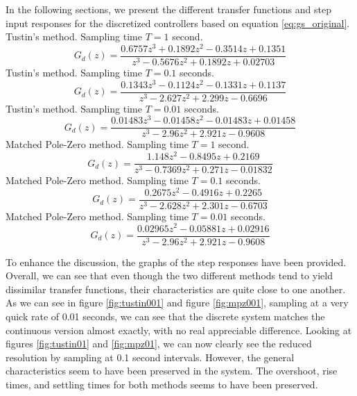 \documentclass[a4paper, 12pt]{article}
\begin{document}
In the following sections, we present the different transfer functions and step
input responses for the discretized controllers based on equation \eqref{eq:gs_original}.\\

\noindent Tustin's method. Sampling time $T = 1$ second.
\begin{equation}
  G_d(z) = \frac{0.6757 z^3 + 0.1892 z^2 - 0.3514 z + 0.1351}{z^3 - 0.5676 z^2 + 0.1892 z + 0.02703}
  \label{eq:tustin_1}
\end{equation}
\noindent Tustin's method. Sampling time $T = 0.1$ seconds.
\begin{equation}
  G_d(z) = \frac{0.1343 z^3 - 0.1124 z^2 - 0.1331 z + 0.1137}{z^3 - 2.627 z^2 + 2.299 z - 0.6696}
  \label{eq:tustin_01}
\end{equation}
\noindent Tustin's method. Sampling time $T = 0.01$ seconds.
\begin{equation}
  G_d(z) = \frac{0.01483 z^3 - 0.01458 z^2 - 0.01483 z + 0.01458}{z^3 - 2.96 z^2 + 2.921 z - 0.9608}
  \label{eq:tustin_001}
\end{equation}
\noindent Matched Pole-Zero method. Sampling time $T = 1$ second.
\begin{equation}
  G_d(z) = \frac{1.148 z^2 - 0.8495 z + 0.2169}{z^3 - 0.7369 z^2 + 0.271 z - 0.01832}
  \label{eq:mpz_1}
\end{equation}
\noindent Matched Pole-Zero method. Sampling time $T = 0.1$ seconds.
\begin{equation}
  G_d(z) = \frac{0.2675 z^2 - 0.4916 z + 0.2265}{z^3 - 2.628 z^2 + 2.301 z - 0.6703}
  \label{eq_mpz_01}
\end{equation}
\noindent Matched Pole-Zero method. Sampling time $T = 0.01$ seconds.
\begin{equation}
  G_d(z) = \frac{0.02965 z^2 - 0.05881 z + 0.02916}{z^3 - 2.96 z^2 + 2.921 z - 0.9608}
  \label{eq:mpz_001}
\end{equation}

To enhance the discussion, the graphs of the step responses have been provided.
Overall, we can see that even though the two different methods tend to yield
dissimilar transfer functions, their characteristics are quite close to one
another. As we can see in figure \ref{fig:tustin001} and figure
\ref{fig:mpz001}, sampling at a very quick rate of 0.01 seconds, we can see
that the discrete system matches the continuous version almost exactly, with no
real appreciable difference. Looking at figures \ref{fig:tustin01} and
\ref{fig:mpz01}, we can now clearly see the reduced resolution by sampling at
0.1 second intervals.  However, the general characteristics seem to have been
preserved in the system.  The overshoot, rise times, and settling times for
both methods seems to have been preserved.
\end{document}
